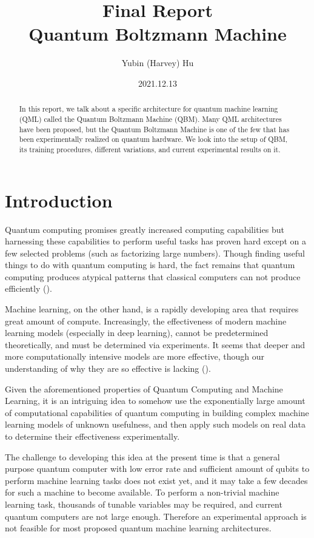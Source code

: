 \documentclass[letterpaper,11pt]{article}
\begin{document}
\title{Final Report \\\textbf{Quantum Boltzmann Machine}}
\author{Yubin (Harvey) Hu}
\date{2021.12.13}
\maketitle

\begin{abstract}
In this report, we talk about a specific architecture for quantum machine learning (QML) called the Quantum Boltzmann Machine (QBM). Many QML architectures have been proposed, but the Quantum Boltzmann Machine is one of the few that has been experimentally realized on quantum hardware. We look into the setup of QBM, its training procedures, different variations, and current experimental results on it. 
\end{abstract}

\section{Introduction}
Quantum computing promises greatly increased computing capabilities but harnessing these capabilities to perform useful tasks has proven hard except on a few selected problems (such as factorizing large numbers). Though finding useful things to do with quantum computing is hard, the fact remains that quantum computing produces atypical patterns that classical computers can not produce efficiently (\cite{NatureQML}). \par

Machine learning, on the other hand, is a rapidly developing area that requires great amount of compute. Increasingly, the effectiveness of modern machine learning models (especially in deep learning), cannot be predetermined theoretically, and must be determined via experiments. It seems that deeper and more computationally intensive models are more effective, though our understanding of why they are so effective is lacking (\cite{DeepLearning}). \par

Given the aforementioned properties of Quantum Computing and Machine Learning, it is an intriguing idea to somehow use the exponentially large amount of computational capabilities of quantum computing in building complex machine learning models of unknown usefulness, and then apply such models on real data to determine their effectiveness experimentally. \par

The challenge to developing this idea at the present time is that a general purpose quantum computer with low error rate and sufficient amount of qubits to perform machine learning tasks does not exist yet, and it may take a few decades for such a machine to become available. To perform a non-trivial machine learning task, thousands of tunable variables may be required, and current quantum computers are not large enough. Therefore an experimental approach is not feasible for most proposed quantum machine learning architectures. 
\end{document}

